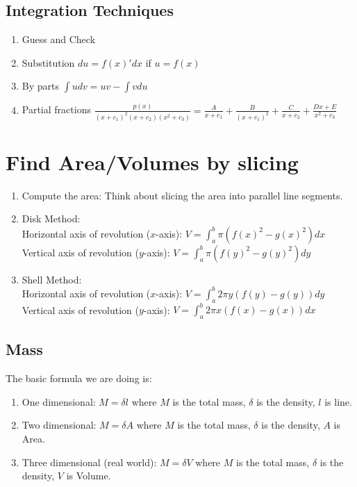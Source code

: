 \documentclass[12pt]{article}
\theoremstyle{definition}
\theoremstyle{definition}
\theoremstyle{remark}
\theoremstyle{definition}
\theoremstyle{definition}
\theoremstyle{definition}
\begin{document}
\subsection{Integration Techniques}
\begin{enumerate}
	\item Guess and Check
	\item Substitution $du=f(x)'dx$ if $u=f(x)$
	\item By parts $\int u dv=uv-\int v du$
	\item Partial fractions $\frac{p(x)}{(x+c_1)^2(x+c_2)(x^2+c_3)}=\frac{A}{x+c_1}+\frac{B}{(x+c_1)^2}+\frac{C}{x+c_2}+ \frac{Dx+E}{x^2+c_3}$

\end{enumerate}


\section{Find Area/Volumes by slicing}

\begin{enumerate}
	\item Compute the area: Think about slicing the area into parallel line segments.
	\item Disk Method:\\
	Horizontal axis of revolution ($x$-axis): $V = \int_a^b \pi(f(x)^2 - g(x)^2)dx$\\
	Vertical axis of revolution ($y$-axis): $V = \int_a^b \pi(f(y)^2 - g(y)^2)dy$
	\item Shell Method:\\
	Horizontal axis of revolution ($x$-axis): $V = \int_a^b 2\pi y(f(y) - g(y))dy$\\
		Vertical axis of revolution ($y$-axis): $V = \int_a^b 2\pi x(f(x) - g(x))dx$

\end{enumerate}

\subsection{Mass}
The basic formula we are doing is:\begin{enumerate}
\item One dimensional: $M=\delta l$ where $M$ is the total mass, $\delta$ is the density, $l$ is line.
\item
Two dimensional: $M=\delta A$ where $M$ is the total mass, $\delta$ is the density, $A$ is Area.
\item Three dimensional (real world): $M=\delta V$ where $M$ is the total mass, $\delta$ is the density, $V$ is Volume.
\end{enumerate}
\end{document}
